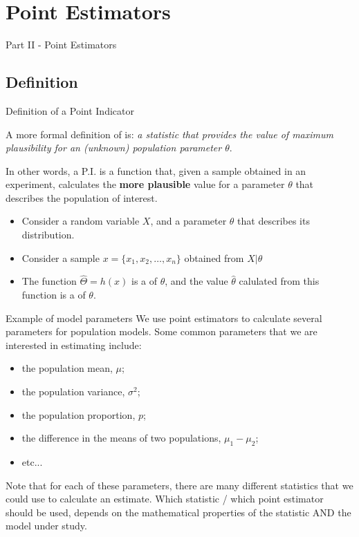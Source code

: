 \section{Point Estimators}
\begin{frame}
  \begin{center}
    Part II - Point Estimators
  \end{center}
\end{frame}

\subsection{Definition}

\begin{frame}{Definition of a Point Indicator}

A more formal definition of  is: \emph{a statistic
that provides the value of maximum plausibility for an (unknown) population
parameter $\theta$}.\bigskip

In other words, a P.I. is a function that, given a sample obtained in an
experiment, calculates the {\bf more plausible} value for a parameter $\theta$
that describes the population of interest.\bigskip

\begin{itemize}
  \item Consider a random variable $X$, and a parameter $\theta$ that describes its distribution.
  \item Consider a sample $x = \{x_1, x_2, \ldots, x_n\}$ obtained from $X|\theta$
  \item The function $\hat{\Theta} = h\left(x\right)$ is a  of $\theta$, and the value $\hat\theta$ calulated from this function is a  of $\theta$.
\end{itemize}
\end{frame}

\begin{frame}{Example of model parameters}
We use point estimators to calculate several parameters for
population models. Some common parameters that we are interested
in estimating include:\bigskip

\begin{itemize}
  \item the population mean, $\mu$;
	\item the population variance, $\sigma^2$;
	\item the population proportion, $p$;
	\item the difference in the means of two populations, $\mu_1-\mu_2$;
	\item etc...
\end{itemize}\bigskip

Note that for each of these parameters, there are many different statistics that we could use to calculate an estimate. Which statistic / which point estimator should be used, depends on the mathematical properties of the statistic AND the model under study.
\end{frame}

